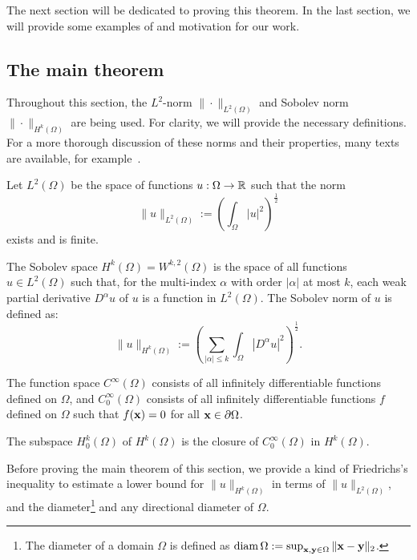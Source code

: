The next section will be dedicated to proving this theorem. In the last section, we will provide some examples of and motivation for our work.


\subsection{The main theorem} \label{sec:main_theorem}

Throughout this section, the $L^2$-norm $\|\cdot\|_{L^2(\Omega)}$ and Sobolev norm $\|\cdot\|_{H^k(\Omega)}$ are being used. For clarity, we will provide the necessary definitions. For a more thorough discussion of these norms and their properties, many texts are available, for example~\cite{adams_sobolev_2003}.

Let $L^2(\Omega)$ be the space of functions $u : \Omega \to \mathbb{R}$ such that the norm
$$
  \|u\|_{L^2(\Omega)} := \left(\int_\Omega \left| u \right|^2 \right)^{\frac{1}{2}}
$$
exists and is finite.

The Sobolev space $ H^k(\Omega) = W^{k, 2}(\Omega) $ is the space of all functions $u \in L^2(\Omega)$ such that, for the multi-index $\alpha$ with order $|\alpha|$ at most $k$, each weak partial derivative $D^\alpha u$ of $u$ is a function in $L^2(\Omega)$. The Sobolev norm of $u$ is defined as:
$$
  \|u\|_{H^k(\Omega)} := \left(\sum_{|\alpha| \leq k} \int_\Omega \left| D^\alpha u \right|^2\right)^{\frac{1}{2}}\text{.}
$$

The function space $C^\infty(\Omega)$ consists of all infinitely differentiable functions defined on $\Omega$, and $C_0^\infty(\Omega)$ consists of all infinitely differentiable functions $f$ defined on $\Omega$ such that $f(\vb{x}) = 0$ for all $\vb{x} \in \partial\Omega$.

The subspace $ H^k_0(\Omega)$ of $H^k(\Omega)$ is the closure of $C_0^\infty(\Omega)$ in $H^k(\Omega)$.

Before proving the main theorem of this section, we provide a kind of Fried\-richs's inequality to estimate a lower bound for $\| u \|_{H^k(\Omega)}$ in terms of $\| u \|_{L^2(\Omega)}$, and the diameter\footnote{The diameter of a domain $\Omega$ is defined as $\operatorname{diam}\Omega := \sup_{\vb{x},\vb{y}\in \Omega} \|\vb{x} - \vb{y}\|_2$.} and any directional diameter of $\Omega$.

